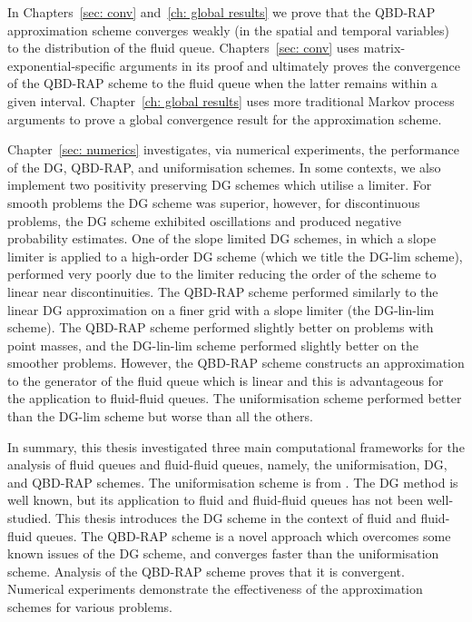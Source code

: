 In Chapters~\ref{sec: conv} and~\ref{ch: global results} we prove that the QBD-RAP approximation scheme converges weakly (in the spatial and temporal variables) to the distribution of the fluid queue. Chapters~\ref{sec: conv} uses matrix-exponential-specific arguments in its proof and ultimately proves the convergence of the QBD-RAP scheme to the fluid queue when the latter remains within a given interval. Chapter~\ref{ch: global results} uses more traditional Markov process arguments to prove a global convergence result for the approximation scheme. 

Chapter~\ref{sec: numerics} investigates, via numerical experiments, the performance of the DG, QBD-RAP, and uniformisation schemes. In some contexts, we also implement two positivity preserving DG schemes which utilise a limiter. For smooth problems the DG scheme was superior, however, for discontinuous problems, the DG scheme exhibited oscillations and produced negative probability estimates. One of the slope limited DG schemes, in which a slope limiter is applied to a high-order DG scheme (which we title the DG-lim scheme), performed very poorly due to the limiter reducing the order of the scheme to linear near discontinuities. The QBD-RAP scheme performed similarly to the linear DG approximation on a finer grid with a slope limiter (the DG-lin-lim scheme). The QBD-RAP scheme performed slightly better on problems with point masses, and the DG-lin-lim scheme performed slightly better on the smoother problems. However, the QBD-RAP scheme constructs an approximation to the generator of the fluid queue which is linear and this is advantageous for the application to fluid-fluid queues. The uniformisation scheme performed better than the DG-lim scheme but worse than all the others. 

In summary, this thesis investigated three main computational frameworks for the analysis of fluid queues and fluid-fluid queues, namely, the uniformisation, DG, and QBD-RAP schemes. The uniformisation scheme is from \cite{bo2013}. The DG method is well known, but its application to fluid and fluid-fluid queues has not been well-studied. This thesis introduces the DG scheme in the context of fluid and fluid-fluid queues. The QBD-RAP scheme is a novel approach which overcomes some known issues of the DG scheme, and converges faster than the uniformisation scheme. Analysis of the QBD-RAP scheme proves that it is convergent. Numerical experiments demonstrate the effectiveness of the approximation schemes for various problems. 